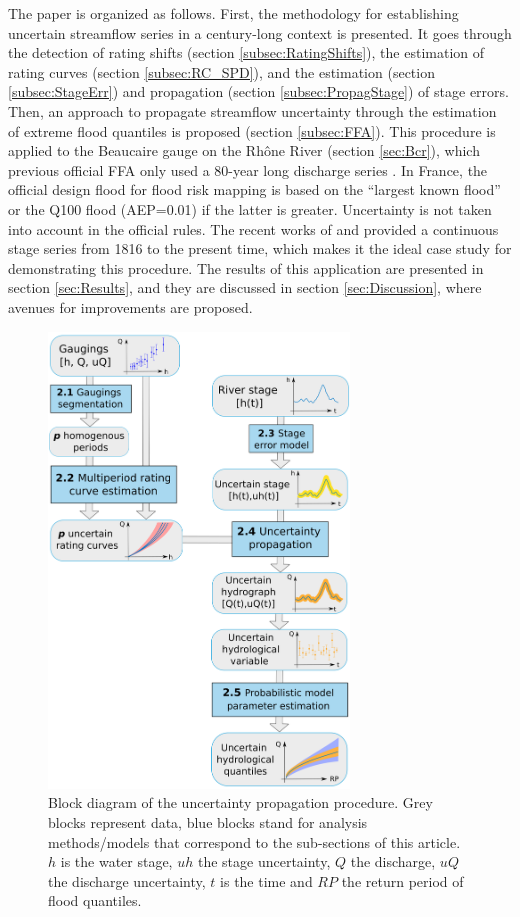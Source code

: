 \documentclass[11pt]{article}
\begin{document}
    The paper is organized as follows. First, the methodology for establishing uncertain streamflow series in a century-long context is presented. It goes through the detection of rating shifts (section \ref{subsec:RatingShifts}), the estimation of rating curves (section \ref{subsec:RC_SPD}), and the estimation (section \ref{subsec:StageErr}) and propagation (section \ref{subsec:PropagStage}) of stage errors. Then, an approach to propagate streamflow uncertainty through the estimation of extreme flood quantiles is proposed (section \ref{subsec:FFA}). This procedure is applied to the Beaucaire gauge on the Rhône River (section \ref{sec:Bcr}), which previous official FFA only used a 80-year long discharge series \citep{rigaudiere_etude_2000}. In France, the official design flood for flood risk mapping is based on the “largest known flood” or the Q100 flood (AEP=0.01) if the latter is greater. Uncertainty is not taken into account in the official rules. The recent works of \citet{pichard_hydro-climatology_2017} and \citet{bard_actualisation_2018} provided a continuous stage series from 1816 to the present time, which makes it the ideal case study for demonstrating this procedure. The results of this application are presented in section \ref{sec:Results}, and they are discussed in section \ref{sec:Discussion}, where avenues for improvements are proposed.
    
    \begin{figure}[h!]
    \centering
        \includegraphics[width = 8cm]{Figs/1-uTotSchema.png}
        \caption{Block diagram of the uncertainty propagation procedure. Grey blocks represent data, blue blocks stand for analysis methods/models that correspond to the sub-sections of this article. $h$ is the water stage, $uh$ the stage uncertainty, $Q$ the discharge, $uQ$ the discharge uncertainty, $t$ is the time and $RP$ the return period of flood quantiles.}
        \label{fig:ChProp}
    \end{figure}
    \FloatBarrier
    
\end{document}
